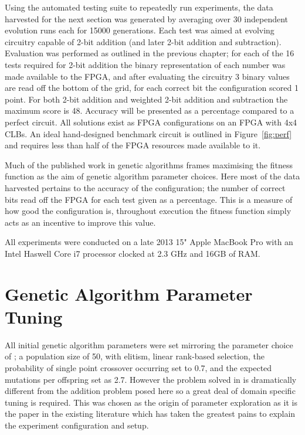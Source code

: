 Using the automated testing suite to repeatedly run experiments, the data
harvested for the next section
was generated by averaging over 30 independent evolution runs
each for 15000 generations. Each test was aimed at evolving circuitry
capable of 2-bit addition (and later 2-bit addition and subtraction). Evaluation
was performed as outlined in the previous chapter; for each of the 16 tests required
for 2-bit addition the binary representation of each number was made available
to the FPGA, and after evaluating the circuitry 3 binary values are read off
the bottom of the grid, for each
correct bit the configuration scored 1 point. For both 2-bit addition and weighted 2-bit
addition and subtraction the maximum score is 48. Accuracy will be presented
as a percentage compared to a perfect circuit. All solutions exist as FPGA configurations
on an FPGA with 4x4 CLBs. An ideal hand-designed benchmark circuit is outlined
in Figure~\ref{fig:perf} and requires less than half of the FPGA resources made available to it.

Much of the published work in genetic algorithms frames maximising the fitness function
as the aim of genetic algorithm parameter choices. Here most of the data harvested
pertains to the accuracy of the configuration; the number of correct bits read off
the FPGA for each test given as a percentage. This is a measure of how good the configuration is, throughout
execution the fitness function simply acts as an incentive to improve this value.

All experiments were conducted on a late 2013 15" Apple MacBook Pro with an
Intel Haswell Core i7 processor clocked at 2.3 GHz and 16GB of RAM.

\section{Genetic Algorithm Parameter Tuning \label{s:ga_tune}}
All initial genetic algorithm parameters were set mirroring the parameter choice
of \cite{10.1007/3-540-63173-9_61};
a population size of 50, with elitism, linear rank-based selection, the probability
of single point crossover occurring set to 0.7, and the expected mutations per
offspring set as 2.7. However the problem solved in \cite{10.1007/3-540-63173-9_61}
is dramatically different from the addition problem posed here so a great deal
of domain specific tuning is required. This was chosen as the origin of parameter
exploration as it is the paper in the existing literature which has taken the greatest
pains to explain the experiment configuration and setup.

